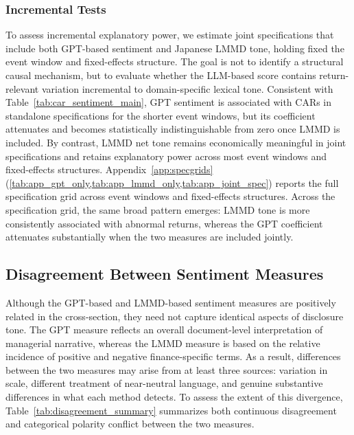 \subsubsection{Incremental Tests}
To assess incremental explanatory power, we estimate joint specifications that include both GPT-based sentiment and Japanese LMMD tone, holding fixed the event window and fixed-effects structure. The goal is not to identify a structural causal mechanism, but to evaluate whether the LLM-based score contains return-relevant variation incremental to domain-specific lexical tone. Consistent with Table~\ref{tab:car_sentiment_main}, GPT sentiment is associated with CARs in standalone specifications for the shorter event windows, but its coefficient attenuates and becomes statistically indistinguishable from zero once LMMD is included. By contrast, LMMD net tone remains economically meaningful in joint specifications and retains explanatory power across most event windows and fixed-effects structures. Appendix~\ref{app:specgrids} (\cref{tab:app_gpt_only,tab:app_lmmd_only,tab:app_joint_spec}) reports the full specification grid across event windows and fixed-effects structures. Across the specification grid, the same broad pattern emerges: LMMD tone is more consistently associated with abnormal returns, whereas the GPT coefficient attenuates substantially when the two measures are included jointly.

\subsection{Disagreement Between Sentiment Measures}
Although the GPT-based and LMMD-based sentiment measures are positively related in the cross-section, they need not capture identical aspects of disclosure tone. The GPT measure reflects an overall document-level interpretation of managerial narrative, whereas the LMMD measure is based on the relative incidence of positive and negative finance-specific terms. As a result, differences between the two measures may arise from at least three sources: variation in scale, different treatment of near-neutral language, and genuine substantive differences in what each method detects. To assess the extent of this divergence, Table~\ref{tab:disagreement_summary} summarizes both continuous disagreement and categorical polarity conflict between the two measures.

